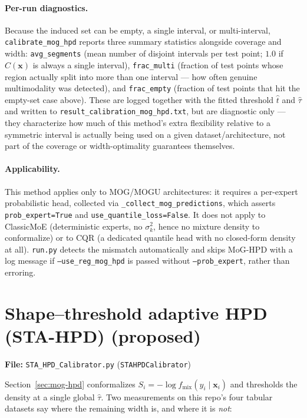 \documentclass[11pt]{article}
\begin{document}
\paragraph{Per-run diagnostics.} Because the induced set can be empty, a single interval, or
multi-interval, \texttt{calibrate\_mog\_hpd} reports three summary statistics alongside coverage
and width: \texttt{avg\_segments} (mean number of disjoint intervals per test point; $1.0$ if
$\hat C(\bm x)$ is always a single interval), \texttt{frac\_multi} (fraction of test points whose
region actually split into more than one interval — how often genuine multimodality was
detected), and \texttt{frac\_empty} (fraction of test points that hit the empty-set case above).
These are logged together with the fitted threshold $\hat t$ and $\hat\tau$ and written to
\texttt{result\_calibration\_mog\_hpd.txt}, but are diagnostic only — they characterize how much
of this method's extra flexibility relative to a symmetric interval is actually being used on a
given dataset/architecture, not part of the coverage or width-optimality guarantees themselves.

\paragraph{Applicability.} This method applies only to MOG/MOGU architectures: it requires a
per-expert probabilistic head, collected via \texttt{\_collect\_mog\_predictions}, which asserts
\texttt{prob\_expert=True} and \texttt{use\_quantile\_loss=False}. It does not apply to
ClassicMoE (deterministic experts, no $\sigma_k^2$, hence no mixture density to conformalize) or
to CQR (a dedicated quantile head with no closed-form density at all). \texttt{run.py} detects
the mismatch automatically and skips MoG-HPD with a log message if \texttt{--use\_reg\_mog\_hpd}
is passed without \texttt{--prob\_expert}, rather than erroring.

\section{Shape--threshold adaptive HPD (STA-HPD) (proposed)}
\label{sec:sta-hpd}
\textbf{File:} \texttt{STA\_HPD\_Calibrator.py} (\texttt{STAHPDCalibrator})

Section~\ref{sec:mog-hpd} conformalizes $S_i=-\log f_{\mathrm{mix}}(y_i\mid\bm x_i)$ and
thresholds the density at a single global $\hat\tau$. Two measurements on this repo's four
tabular datasets say where the remaining width is, and where it is \emph{not}:
\end{document}
